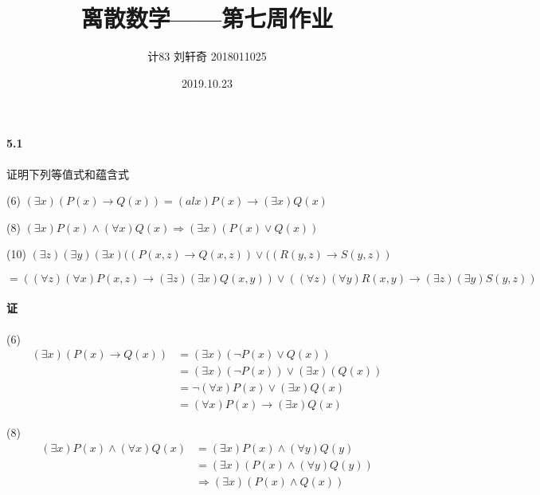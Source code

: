 \documentclass[hyperref, UTF8]{ctexart}
\title{离散数学——第七周作业}
\author{计83  刘轩奇  2018011025}
\date{2019.10.23}
\begin{document}
\maketitle

\paragraph{5.1}\label{5.1}
证明下列等值式和蕴含式

(6) $ ( \exists x)(P(x) \rightarrow Q(x)) = (al x)P(x) \rightarrow ( \exists x)Q(x) $

(8) $ ( \exists x)P(x) \land ( \forall x)Q(x) \Rightarrow ( \exists x)(P(x) \lor Q(x)) $

(10) $ ( \exists z) ( \exists y) ( \exists x)((P(x,z) \rightarrow Q(x,z)) \lor ((R(y,z) \rightarrow S(y,z)) $ 

\qquad $ = ( ( \forall z) ( \forall x)P(x,z) \rightarrow ( \exists z) ( \exists x)Q(x,y)) \lor ( ( \forall z) ( \forall y)R(x,y) \rightarrow ( \exists z) ( \exists y)S(y,z)) $

\paragraph{证}
(6)
\begin{align*}
( \exists x)(P(x) \rightarrow Q(x)) 
&= ( \exists x)(\lnot P(x) \lor Q(x))
\\ &= ( \exists x)(\lnot P(x)) \lor ( \exists x)(Q(x))
\\ &= \lnot ( \forall x)P(x) \lor ( \exists x)Q(x) 
\\ &= ( \forall x)P(x) \rightarrow ( \exists x)Q(x)
\end{align*}

(8)
\begin{align*}
( \exists x)P(x) \land ( \forall x)Q(x) 
&= ( \exists x)P(x) \land ( \forall y)Q(y)
\\ &= ( \exists x)(P(x) \land ( \forall y)Q(y))
\\ &\Rightarrow ( \exists x)(P(x) \land Q(x))
\end{align*}
\end{document}
